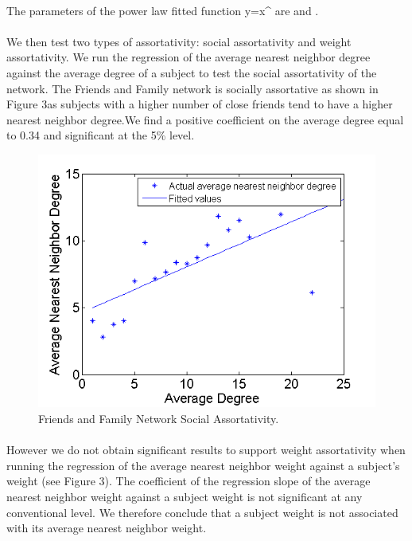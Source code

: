\documentclass[11pt]{article}
\begin{document}
\paragraph{}
The parameters of the power law fitted function y=\alpha x^\beta \]   are  \] and \].

\paragraph{}
We then test two types of assortativity: social assortativity and weight assortativity. We run the regression of the average nearest neighbor degree against the average degree of a subject to test the social assortativity of the network. The Friends and Family network is socially assortative as shown in Figure 3as subjects with a higher number of close friends tend to have a higher nearest neighbor degree.We find a positive coefficient on the average degree equal to 0.34 and significant at the 5\% level.


\begin{figure}[!h]
\center
   \includegraphics[scale=0.72]{social_assortativity_figure2.png}
   \caption{\label{2} Friends and Family Network Social Assortativity.}
\end{figure}

\paragraph{}
However we do not obtain significant results to support weight assortativity when running the regression of the average nearest neighbor weight against a subject's weight (see Figure 3). The coefficient of the regression slope of the average nearest neighbor weight against a subject weight is not significant at any conventional level. We therefore conclude that a subject weight is not associated with its average nearest neighbor weight. 
\end{document}
